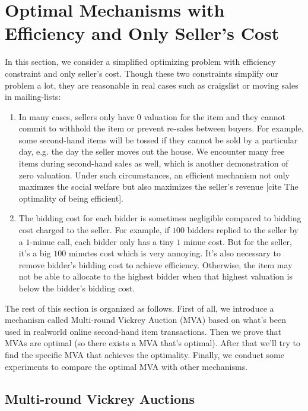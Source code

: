 \section{Optimal Mechanisms with Efficiency and Only Seller's Cost}

In this section, we consider a simplified optimizing problem with efficiency
constraint and only seller's cost.  Though these two
constraints simplify our problem a lot, they are reasonable in real cases such
as craigslist or moving sales in mailing-lists:

\begin{enumerate}

\item In many cases, sellers only have $0$ valuation for the item and
they cannot commit to withhold the item or prevent re-sales between buyers.
For example, some second-hand items will be tossed if they cannot be sold by a
particular day, e.g. the day the seller moves out the house. We encounter many
free items during second-hand sales as well, which is another demonstration of
zero valuation. Under such circumstances, an efficient mechanism not only
maximzes the social welfare but also maximizes the seller's revenue [cite The
optimality of being efficient].

\item The bidding cost for each bidder is sometimes negligible compared to
bidding cost charged to the seller. For example, if $100$ bidders replied to
the seller by a $1$-minue call, each bidder only has a tiny $1$ minue cost.
But for the seller, it's a big $100$ minutes cost which is very annoying. It's
also necessary to remove bidder's bidding cost to achieve efficiency.
Otherwise, the item may not be able to allocate to the highest bidder
when that highest valuation is below the bidder's bidding cost.

\end{enumerate}

The rest of this section is organized as follows. First of all, we introduce a
mechanism called Multi-round Vickrey Auction (MVA) based on what's been used in
realworld online second-hand item transactions.  Then we prove that MVAs are
optimal (so there exists a MVA that's optimal). After that we'll try to find
the specific MVA that achieves the optimality. Finally, we conduct some
experiments to compare the optimal MVA with other mechanisms.

\subsection{Multi-round Vickrey Auctions}

